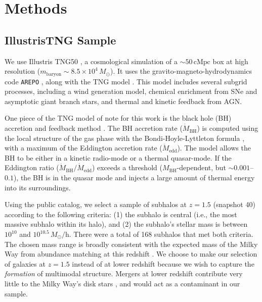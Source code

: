 \documentclass[twocolumn]{aastex631}
\newcommand{\Msun}{\ensuremath{M_{\odot}}}
\begin{document}
\section{Methods}\label{sec:methods}
\subsection{IllustrisTNG Sample}\label{ssec:tng}
We use Illustris TNG50 \citep{2019MNRAS.490.3196P, 2019MNRAS.490.3234N, 2019ComAC...6....2N}, a cosmological simulation of a $\sim50\,\textrm{cMpc}$ box at high resolution ($m_{\textrm{baryon}}\sim8.5\times10^4\,\Msun$). It uses the gravito-magneto-hydrodynamics code \texttt{AREPO} \citep{2010MNRAS.401..791S, 2016MNRAS.455.1134P}, along with the TNG model \citep{2013MNRAS.436.3031V, 2017MNRAS.465.3291W, 2018MNRAS.473.4077P}. This model includes several subgrid processes, including a wind generation model, chemical enrichment from SNe and asymptotic giant branch stars, and thermal and kinetic feedback from AGN.

One piece of the TNG model of note for this work is the black hole (BH) accretion and feedback method \citep{2017MNRAS.465.3291W}. The BH accretion rate ($\dot{M}_{\textrm{BH}}$) is computed using the local structure of the gas phase with the Bondi-Hoyle-Lyttleton formula \citep{1939PCPS...35..405H,1944MNRAS.104..273B,1952MNRAS.112..195B}, with a maximum of the Eddington accretion rate ($\dot{M}_{\textrm{edd}}$). The model allows the BH to be either in a kinetic radio-mode or a thermal quasar-mode. If the Eddington ratio ($\dot{M}_{\textrm{BH}}/\dot{M}_{\textrm{edd}}$) exceeds a threshold ($M_{\textrm{BH}}$-dependent, but $\sim0.001$--$0.1$), the BH is in the quasar mode and injects a large amount of thermal energy into its surroundings.

Using the public catalog, we select a sample of subhalos at $z=1.5$ (snapshot 40) according to the following criteria: (1) the subhalo is central (i.e., the most massive subhalo within its halo), and (2) the subhalo's stellar mass is between $10^{10}$ and $10^{10.5}\,\Msun/\textrm{h}$. There were a total of 168 subhalos that met both criteria. The chosen mass range is broadly consistent with the expected mass of the Milky Way from abundance matching at this redshift \citep{2013ApJ...771L..35V}. We choose to make our selection of galaxies at $z=1.5$ instead of at lower redshift because we wish to capture the \textit{formation} of multimodal structure. Mergers at lower redshift contribute very little to the Milky Way's disk stars \citep[e.g.,][]{2016ARA&A..54..529B}, and would act as a contaminant in our sample.
\end{document}
